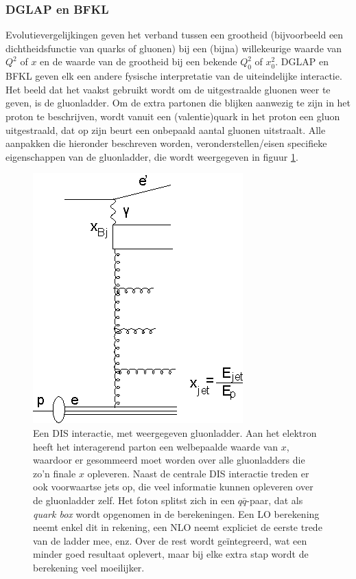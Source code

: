 \documentclass[a4paper,11pt]{article}
\numberwithin{equation}{section} %
\begin{document}
    \subsubsection{DGLAP en BFKL}
Evolutievergelijkingen geven het verband tussen een grootheid (bijvoorbeeld een dichtheidsfunctie van quarks of gluonen) bij een (bijna) willekeurige waarde van $Q^2$ of $x$ en de waarde van de grootheid bij een bekende $Q_0^2$ of $x_0^2$.
DGLAP en BFKL geven elk een andere fysische interpretatie van de uiteindelijke interactie.
Het beeld dat het vaakst gebruikt wordt om de uitgestraalde gluonen weer te geven, is de gluonladder.
Om de extra partonen die blijken aanwezig te zijn in het proton te beschrijven, wordt vanuit een (valentie)quark in het proton een gluon uitgestraald, dat op zijn beurt een onbepaald aantal gluonen uitstraalt.
Alle aanpakken die hieronder beschreven worden, veronderstellen/eisen specifieke eigenschappen van de gluonladder, die wordt weergegeven in figuur \ref{fig:GluonLadder}.
\begin{figure} [H]
  \begin{center}
    \includegraphics[scale=1]{Afbeeldingen/GluonLadder.eps}
    \caption{Een DIS interactie, met weergegeven gluonladder. Aan het elektron heeft het interagerend parton een welbepaalde waarde van $x$, waardoor er gesommeerd moet worden over alle gluonladders die zo’n finale $x$ opleveren. Naast de centrale DIS interactie treden er ook voorwaartse jets op, die veel informatie kunnen opleveren over de gluonladder zelf. Het foton splitst zich in een $q\bar{q}$-paar, dat als \textit{quark box} wordt opgenomen in de berekeningen. Een LO berekening neemt enkel dit in rekening, een NLO neemt expliciet de eerste trede van de ladder mee, enz. Over de rest wordt geïntegreerd, wat een minder goed resultaat oplevert, maar bij elke extra stap wordt de berekening veel moeilijker. \cite{Kiesling}}
   \label{fig:GluonLadder}
  \end{center}
\end{figure}
\end{document}
